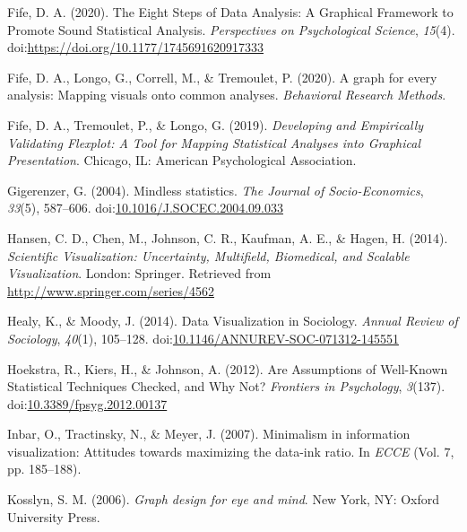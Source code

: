 \documentclass[
  man]{apa6}
\newlength{\cslhangindent}
\newenvironment{cslreferences}%
  {\setlength{\parindent}{0pt}%
  \everypar{\setlength{\hangindent}{\cslhangindent}}\ignorespaces}%
  {\par}
\begin{document}
\begin{cslreferences}
\leavevmode\hypertarget{ref-Fife2019e}{}%
Fife, D. A. (2020). The Eight Steps of Data Analysis: A Graphical Framework to Promote Sound Statistical Analysis. \emph{Perspectives on Psychological Science}, \emph{15}(4). doi:\href{https://doi.org/https://doi.org/10.1177/1745691620917333}{https://doi.org/10.1177/1745691620917333}

\leavevmode\hypertarget{ref-fife2020bb}{}%
Fife, D. A., Longo, G., Correll, M., \& Tremoulet, P. (2020). A graph for every analysis: Mapping visuals onto common analyses. \emph{Behavioral Research Methods}.

\leavevmode\hypertarget{ref-Fife2019d}{}%
Fife, D. A., Tremoulet, P., \& Longo, G. (2019). \emph{Developing and Empirically Validating Flexplot: A Tool for Mapping Statistical Analyses into Graphical Presentation}. Chicago, IL: American Psychological Association.

\leavevmode\hypertarget{ref-Gigerenzer2004}{}%
Gigerenzer, G. (2004). Mindless statistics. \emph{The Journal of Socio-Economics}, \emph{33}(5), 587--606. doi:\href{https://doi.org/10.1016/J.SOCEC.2004.09.033}{10.1016/J.SOCEC.2004.09.033}

\leavevmode\hypertarget{ref-Hansen}{}%
Hansen, C. D., Chen, M., Johnson, C. R., Kaufman, A. E., \& Hagen, H. (2014). \emph{Scientific Visualization: Uncertainty, Multifield, Biomedical, and Scalable Visualization}. London: Springer. Retrieved from \url{http://www.springer.com/series/4562}

\leavevmode\hypertarget{ref-Healy2014a}{}%
Healy, K., \& Moody, J. (2014). Data Visualization in Sociology. \emph{Annual Review of Sociology}, \emph{40}(1), 105--128. doi:\href{https://doi.org/10.1146/ANNUREV-SOC-071312-145551}{10.1146/ANNUREV-SOC-071312-145551}

\leavevmode\hypertarget{ref-hoekstra_are_2012}{}%
Hoekstra, R., Kiers, H., \& Johnson, A. (2012). Are Assumptions of Well-Known Statistical Techniques Checked, and Why Not? \emph{Frontiers in Psychology}, \emph{3}(137). doi:\href{https://doi.org/10.3389/fpsyg.2012.00137}{10.3389/fpsyg.2012.00137}

\leavevmode\hypertarget{ref-inbar2007minimalism}{}%
Inbar, O., Tractinsky, N., \& Meyer, J. (2007). Minimalism in information visualization: Attitudes towards maximizing the data-ink ratio. In \emph{ECCE} (Vol. 7, pp. 185--188).

\leavevmode\hypertarget{ref-Kosslyn2006e}{}%
Kosslyn, S. M. (2006). \emph{Graph design for eye and mind}. New York, NY: Oxford University Press.


\end{cslreferences}
\end{document}
